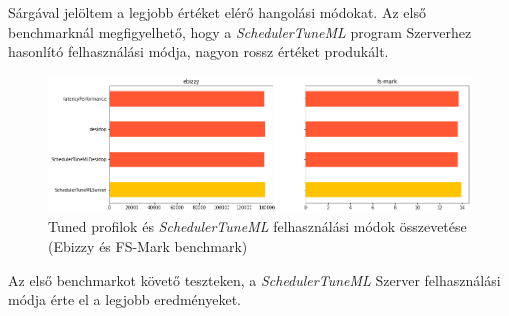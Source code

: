 Sárgával jelöltem a legjobb értéket elérő hangolási módokat. Az első benchmarknál megfigyelhető, hogy a \textit{SchedulerTuneML} program Szerverhez hasonlító felhasználási módja, nagyon rossz értéket produkált.

\begin{figure}[h!]
\centering
\includegraphics[width=\textwidth]{images/tunedAndSchedulerTuneMLCompareEbizzyAndFsMark.png}
\caption{Tuned profilok és \textit{SchedulerTuneML} felhasználási módok összevetése (Ebizzy és FS-Mark benchmark)}
\label{fig:tunedProfilesComparedToSchedulerTuneMlEbizzyAndFsMark}
\end{figure}

Az első benchmarkot követő teszteken, a \textit{SchedulerTuneML} Szerver felhasználási módja érte el a legjobb eredményeket.